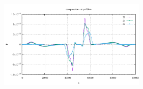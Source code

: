 \begin{center}
\includegraphics[width=7cm]{python_codes/fieldstone_70/results_vpstudy/exy_compression.pdf}\\
\end{center}




